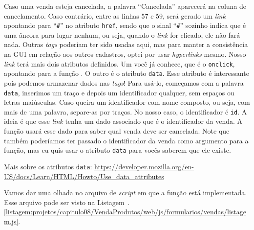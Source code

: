 
Caso uma venda esteja cancelada, a palavra ``Cancelada'' aparecerá na coluna de cancelamento. Caso contrário, entre as linhas 57 e 59, será gerado um \textit{link} apontando para ``\texttt{\#}'' no atributo \texttt{href}, sendo que o sinal ``\texttt{\#}'' sozinho indica que é uma âncora para lugar nenhum, ou seja, quando o \textit{link} for clicado, ele não fará nada. Outras \textit{tags} poderiam ter sido usadas aqui, mas para manter a consistência na GUI em relação aos outros cadastros, optei por usar \textit{hyperlinks} mesmo. Nosso \textit{link} terá mais dois atributos definidos. Um você já conhece, que é o \texttt{onclick}, apontando para a função . O outro é o atributo \texttt{data}. Esse atributo é interessante pois podemos armazenar dados nas \textit{tags}! Para usá-lo, começamos com a palavra \texttt{data}, inserimos um traço e depois um identificador qualquer, sem espaços ou letras maiúsculas. Caso queira um identificador com nome composto, ou seja, com mais de uma palavra, separe-as por traços. No nosso caso, o identificador é \texttt{id}. A ideia é que esse \textit{link} tenha um dado associado que é o identificador da venda. A função  usará esse dado para saber qual venda deve ser cancelada. Note que também poderíamos ter passado o identificador da venda como argumento para a função, mas eu quis usar o atributo \texttt{data} para vocês saberem que ele existe.

\begin{saibaMais}
    Mais sobre os atributos \texttt{data}: \url{https://developer.mozilla.org/en-US/docs/Learn/HTML/Howto/Use_data_attributes}
\end{saibaMais}

Vamos dar uma olhada no arquivo de \textit{script} em que a função  está implementada. Esse arquivo pode ser visto na Listagem~\thechapter.\ref{listagem:projetos/capitulo08/VendaProdutos/web/js/formularios/vendas/listagem.js}.


